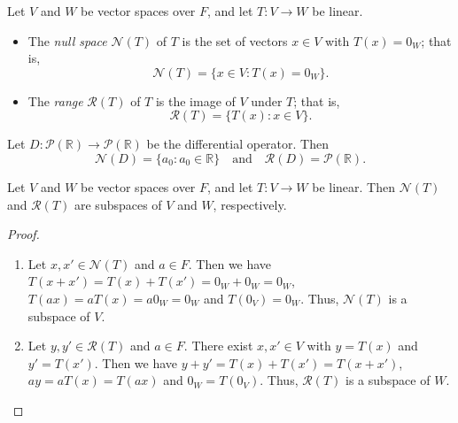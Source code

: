 \begin{definition}
  Let $V$ and $W$ be vector spaces over $F$, and let $T: V \to W$ be linear.
  \begin{itemize}
    \item The \emph{null space} $\mathcal{N}(T)$ of $T$ is the set of vectors
      $x \in V$ with $T(x) = 0_W$; that is,
      \begin{equation*}
        \mathcal{N}(T) = \{x \in V: T(x) = 0_W\}.
      \end{equation*}
    \item The \emph{range} $\mathcal{R}(T)$ of $T$ is the image of $V$ under
      $T$; that is,
      \begin{equation*}
        \mathcal{R}(T) = \{T(x): x \in V\}.
      \end{equation*}
  \end{itemize}
\end{definition}
\begin{example}
  Let $D: \mathcal{P}(\mathbb{R}) \to \mathcal{P}(\mathbb{R})$ be the
  differential operator. Then
  \begin{equation*}
    \mathcal{N}(D) = \{a_0: a_0 \in \mathbb{R}\}
    \quad \text{and}
    \quad \mathcal{R}(D) = \mathcal{P}(\mathbb{R}).
  \end{equation*}
\end{example}

\begin{theorem}\label{thm:kernel-range-subspace}
  Let $V$ and $W$ be vector spaces over $F$, and let $T: V \to W$ be linear.
  Then $\mathcal{N}(T)$ and $\mathcal{R}(T)$ are subspaces of $V$ and $W$,
  respectively.
\end{theorem}
\begin{proof} \leavevmode
  \begin{enumerate}
    \item Let $x, x' \in \mathcal{N}(T)$ and $a \in F$. Then we have
      $T(x + x') = T(x) + T(x') = 0_W + 0_W = 0_W$,
      $T(ax) = aT(x) = a0_W = 0_W$
      and $T(0_V) = 0_W$.
      Thus, $\mathcal{N}(T)$ is a subspace of $V$.
    \item Let $y, y' \in \mathcal{R}(T)$ and $a \in F$. There exist
      $x, x' \in V$ with $y = T(x)$ and $y' = T(x')$. Then we have
      $y + y' = T(x) + T(x') = T(x + x')$,
      $ay = aT(x) = T(ax)$
      and $0_W = T(0_V)$.
      Thus, $\mathcal{R}(T)$ is a subspace of $W$. \qedhere
  \end{enumerate}
\end{proof}

